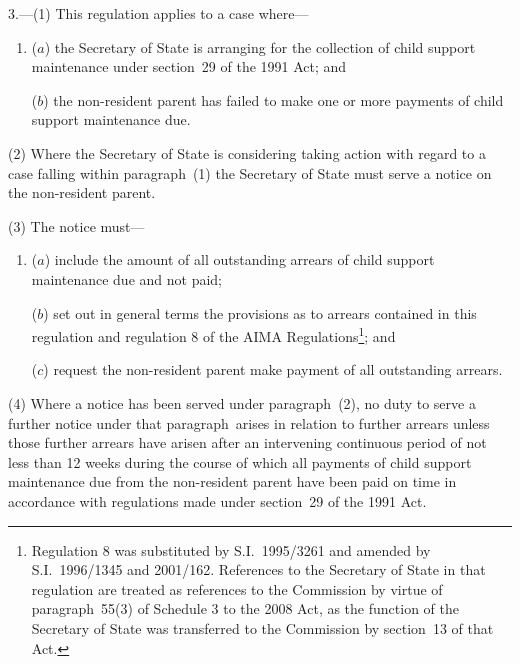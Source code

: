 \documentclass[12pt,a4paper]{article}
\begin{document}
3.---(1)  This regulation applies to a case where—
\begin{enumerate}\item[]
($a$) the 
Secretary of State  %
is arranging for the collection of child support maintenance under section~29 of the 1991 Act; and

($b$) the non-resident parent has failed to make one or more payments of child support maintenance due.
\end{enumerate}

(2) Where the 
Secretary of State  %
is considering taking action with regard to a case falling within paragraph~(1) 
the Secretary of State  %
must serve a notice on the non-resident parent.

(3) The notice must—
\begin{enumerate}\item[]

($a$) include the amount of all outstanding arrears of child support maintenance due and not paid;

($b$) set out in general terms the provisions as to arrears contained in this regulation and regulation 8 of the AIMA Regulations\footnote{Regulation 8 was substituted by S.I.~1995/3261 and amended by S.I.~1996/1345 and 2001/162. References to the Secretary of State in that regulation are treated as references to the Commission by virtue of paragraph~55(3) of Schedule 3 to the 2008 Act, as the function of the Secretary of State was transferred to the Commission by section~13 of that Act.}; and

($c$) request the non-resident parent make payment of all outstanding arrears.
\end{enumerate}

(4) Where a notice has been served under paragraph~(2), no duty to serve a further notice under that paragraph~arises in relation to further arrears unless those further arrears have arisen after an intervening continuous period of not less than 12 weeks during the course of which all payments of child support maintenance due from the non-resident parent have been paid on time in accordance with regulations made under section~29 of the 1991 Act.
\end{document}
